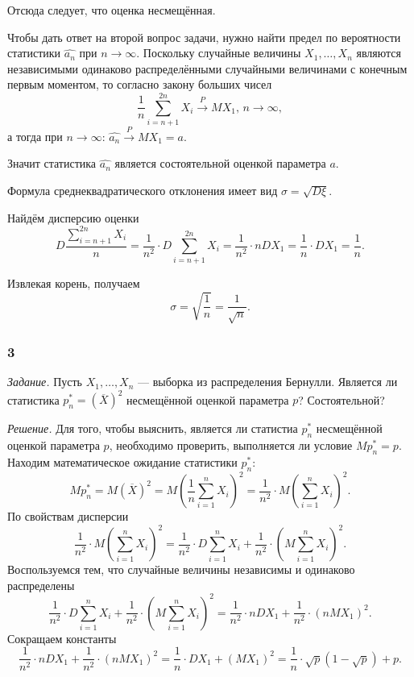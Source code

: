 Отсюда следует, что оценка несмещённая.

Чтобы дать ответ на второй вопрос задачи,
нужно найти предел по вероятности статистики $ \hat{a_n}$ при $n \to \infty $.
Поскольку случайные величины $X_1, \dotsc, X_n$
являются независимыми одинаково распределёнными случайными величинами с конечным первым моментом,
то согласно закону больших чисел
$$ \frac{1}{n} \sum \limits_{i = n + 1}^{2n} X_i \overset{P}{ \rightarrow } MX_1, \,
  n \to \infty,$$
а тогда при $n \to \infty: \, \hat{a_n} \overset{P}{ \rightarrow } MX_1 = a$.

Значит статистика $ \hat{a_n}$ является состоятельной оценкой параметра $a$.

Формула среднеквадратического отклонения имеет вид $ \sigma = \sqrt{D \xi }$.

Найдём дисперсию оценки
$$D \frac{ \sum \limits_{i = n + 1}^{2n} X_i}{n} =
  \frac{1}{n^2} \cdot D \sum \limits_{i = n + 1}^{2n} X_i =
  \frac{1}{n^2} \cdot nDX_1 =
  \frac{1}{n} \cdot DX_1 =
  \frac{1}{n}.$$

Извлекая корень, получаем
$$ \sigma =
  \sqrt{ \frac{1}{n}} =
  \frac{1}{ \sqrt{n}}.$$

\subsubsection*{3}

\textit{Задание.} Пусть $X_1, \dotsc, X_n$ --- выборка из распределения Бернулли.
Является ли статистика $p_n^* = \left( \overline{X} \right)^2$ несмещённой оценкой параметра $p$?
Состоятельной?

\textit{Решение.}
Для того, чтобы выяснить, является ли статистиа $p_n^*$ несмещённой оценкой параметра $p$,
необходимо проверить, выполняется ли условие $Mp_n^* = p$.
Находим математическое ожидание статистики $p_n^*:$
$$Mp_n^* =
  M \left( \overline{X} \right)^2 =
  M \left( \frac{1}{n} \sum \limits_{i = 1}^n X_i \right)^2 =
  \frac{1}{n^2} \cdot M \left( \sum \limits_{i = 1}^n X_i \right)^2.$$
По свойствам дисперсии
$$ \frac{1}{n^2} \cdot M \left( \sum \limits_{i = 1}^n X_i \right)^2 =
  \frac{1}{n^2} \cdot D \sum \limits_{i = 1}^n X_i +
  \frac{1}{n^2} \cdot \left( M \sum \limits_{i = 1}^n X_i \right)^2.$$
Воспользуемся тем, что случайные величины независимы и одинаково распределены
$$ \frac{1}{n^2} \cdot D \sum \limits_{i = 1}^n X_i +
  \frac{1}{n^2} \cdot \left( M \sum \limits_{i = 1}^n X_i \right)^2 =
  \frac{1}{n^2} \cdot nDX_1 + \frac{1}{n^2} \cdot \left( nMX_1 \right)^2.$$
Сокращаем константы
$$ \frac{1}{n^2} \cdot nDX_1 + \frac{1}{n^2} \cdot \left( nMX_1 \right)^2 =
  \frac{1}{n} \cdot DX_1 + \left( MX_1 \right)^2 =
  \frac{1}{n} \cdot \sqrt{p} \left( 1 - \sqrt{p} \right) + p.$$

